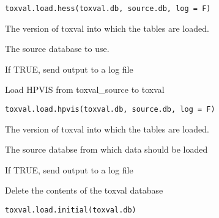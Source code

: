 \documentclass[letterpaper]{book}
\begin{document}
%
\begin{Usage}
\begin{verbatim}
toxval.load.hess(toxval.db, source.db, log = F)
\end{verbatim}
\end{Usage}
%
\begin{Arguments}
\begin{ldescription}
\item[\code{toxval.db}] The version of toxval into which the tables are loaded.

\item[\code{source.db}] The source database to use.

\item[\code{log}] If TRUE, send output to a log file
\end{ldescription}
\end{Arguments}
%
\begin{Description}\relax
Load HPVIS from toxval\_source to toxval
\end{Description}
%
\begin{Usage}
\begin{verbatim}
toxval.load.hpvis(toxval.db, source.db, log = F)
\end{verbatim}
\end{Usage}
%
\begin{Arguments}
\begin{ldescription}
\item[\code{toxval.db}] The version of toxval into which the tables are loaded.

\item[\code{source.db}] The source databse from which data should be loaded

\item[\code{log}] If TRUE, send output to a log file
\end{ldescription}
\end{Arguments}
%
\begin{Description}\relax
Delete the contents of the toxval database
\end{Description}
%
\begin{Usage}
\begin{verbatim}
toxval.load.initial(toxval.db)
\end{verbatim}
\end{Usage}
\end{document}

